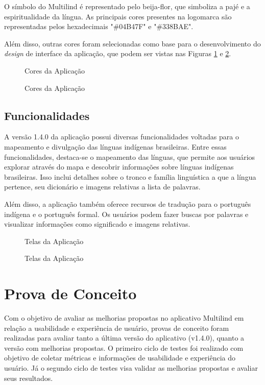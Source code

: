 O símbolo do Multilind é representado pelo beija-flor, que simboliza a pajé e a espiritualidade da língua. As principais cores presentes na logomarca são representadas pelos hexadecimais "\#04B47F" e "\#338BAE".

Além disso, outras cores foram selecionadas como base para o desenvolvimento do \textit{design} de interface da aplicação, que podem ser vistas nas Figuras \ref{fig16} e \ref{fig17}.

\begin{figure}[h!]
	\centering
	\caption{Cores da Aplicação}
	\label{fig16}
\end{figure}

\begin{figure}[h!]
	\centering
	\caption{Cores da Aplicação}
	\label{fig17}
\end{figure}

\subsection{Funcionalidades}
\label{Funcionalidades}
A versão 1.4.0 da aplicação possui diversas funcionalidades voltadas para o mapeamento e divulgação das línguas indígenas brasileiras. Entre essas funcionalidades, destaca-se o mapeamento das línguas, que permite aos usuários 
explorar através do mapa e descobrir informações sobre línguas indígenas brasileiras. Isso inclui detalhes sobre o tronco e família linguística a que a língua pertence, seu dicionário e imagens relativas a lista de palavras.

Além disso, a aplicação também oferece recursos de tradução para o português indígena e o português formal. Os usuários podem fazer buscas por palavras e visualizar informações como significado e imagens relativas.

\begin{figure}[h!]
	\centering
	\caption{Telas da Aplicação}
	\label{fig18}
\end{figure}

\begin{figure}[h!]
	\centering
	\caption{Telas da Aplicação}
	\label{fig19}
\end{figure}


\section{Prova de Conceito}
\label{sec:Prova de Conceito}
Com o objetivo de avaliar as melhorias propostas no aplicativo Multilind em relação a usabilidade e experiência de usuário, provas de conceito foram 
realizadas para avaliar tanto a última versão do aplicativo (v1.4.0), quanto a versão com melhorias propostas. O primeiro ciclo de testes foi realizado 
com objetivo de coletar métricas e informações de usabilidade e experiência do usuário. Já o segundo ciclo de testes visa validar as melhorias propostas e avaliar seus resultados.

